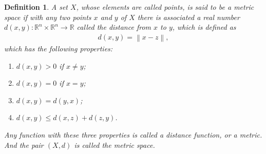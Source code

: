 \documentclass[10pt]{book}
\newtheorem{definition}{Definition}[chapter]
\theoremstyle{definition}
\numberwithin{equation}{chapter}
\begin{document}
\begin{definition}\label{def_19}
A set $X$, whose elements are called points, is said to be a metric space if with any two points $x$ and $y$ of $X$ there is associated a real number $d(x,y): \mathbb{R}^n \times \mathbb{R}^n \rightarrow \mathbb{R}$ called the distance from $x$ to $y$, which is defined as 
\begin{align*}
    d(x,y) = \left\|x - z\right\|,
\end{align*}
which has the following properties:
\begin{enumerate}[label=(\alph*)]
    \item $d(x,y) > 0$ if $x\neq y$;
    \item $d(x,y) = 0$ if $x = y$;
    \item $d(x,y) = d(y,x)$;
    \item $d(x,y) \leq d(x,z) + d(z,y)$.
\end{enumerate}
Any function with these three properties is called a distance function, or a metric. And the pair $(X,d)$ is called the metric space.
\end{definition}

\medskip
\end{document}
